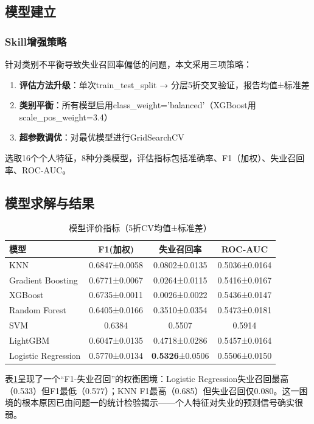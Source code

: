 \documentclass[withoutpreface,bwprint]{cumcmthesis}
\begin{document}
\subsection{模型建立}

\subsubsection{Skill增强策略}

针对类别不平衡导致失业召回率偏低的问题，本文采用三项策略：
\begin{enumerate}
\item \textbf{评估方法升级}：单次train\_test\_split → 分层5折交叉验证，报告均值±标准差
\item \textbf{类别平衡}：所有模型启用class\_weight='balanced'（XGBoost用scale\_pos\_weight=3.4）
\item \textbf{超参数调优}：对最优模型进行GridSearchCV
\end{enumerate}

选取16个个人特征，8种分类模型，评估指标包括准确率、F1（加权）、失业召回率、ROC-AUC。

\subsection{模型求解与结果}

\begin{table}[H]
\centering
\caption{模型评价指标（5折CV均值±标准差）}
\begin{tabular}{lccc}
\toprule
模型 & F1(加权) & 失业召回率 & ROC-AUC \\
\midrule
KNN & 0.6847±0.0058 & 0.0802±0.0135 & 0.5036±0.0164 \\
Gradient Boosting & 0.6771±0.0067 & 0.0264±0.0115 & 0.5416±0.0167 \\
XGBoost & 0.6735±0.0011 & 0.0026±0.0022 & 0.5436±0.0147 \\
Random Forest & 0.6405±0.0166 & 0.3510±0.0354 & 0.5473±0.0181 \\
SVM & 0.6384 & 0.5507 & 0.5914 \\
LightGBM & 0.6047±0.0135 & 0.4718±0.0286 & 0.5457±0.0164 \\
Logistic Regression & 0.5770±0.0134 & \textbf{0.5326}±0.0506 & 0.5506±0.0150 \\
\bottomrule
\end{tabular}
\label{tab:model_cv}
\end{table}

表\ref{tab:model_cv}呈现了一个“F1-失业召回”的权衡困境：Logistic Regression失业召回最高（0.533）但F1最低（0.577）；KNN F1最高（0.685）但失业召回仅0.080。这一困境的根本原因已由问题一的统计检验揭示——个人特征对失业的预测信号确实很弱。
\end{document}

